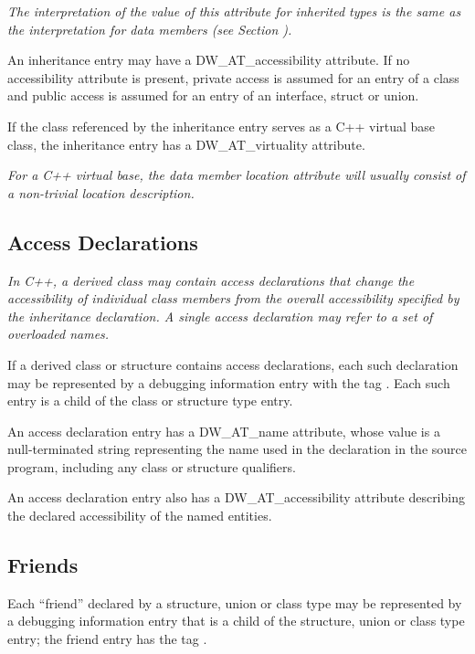 \textit{The interpretation of the value of this attribute for
inherited types is the same as the interpretation for data
members 
(see Section ).  }

An inheritance entry may have a
DW\_AT\_accessibility attribute. If no accessibility attribute
is present, private access is assumed for an entry of a class
and public access is assumed for an entry of an interface,
struct or union.

If the class referenced by the inheritance entry serves
as a C++ virtual base class, the inheritance entry has a
DW\_AT\_virtuality attribute.

\textit{For a C++ virtual base, the data member location attribute
will usually consist of a non-trivial location description.}

\subsection{Access Declarations}
\label{chap:accessdeclarations}

\textit{In C++, a derived class may contain access declarations that
change the accessibility of individual class members from the
overall accessibility specified by the inheritance declaration.
A single access declaration may refer to a set of overloaded
names.}

If a derived class or structure contains access declarations,
each such declaration may be represented by a debugging
information entry with the tag 
. 
Each
such entry is a child of the class or structure type entry.

An access declaration entry has a DW\_AT\_name attribute, whose
value is a null-terminated string representing the name used
in the declaration in the source program, including any class
or structure qualifiers.

An access declaration entry also has a DW\_AT\_accessibility
attribute describing the declared accessibility of the named
entities.


\subsection{Friends}
\label{chap:friends}

Each ``friend'' declared by a structure, union or class
type may be represented by a debugging information entry
that is a child of the structure, union or class type entry;
the friend entry has the 
tag .

